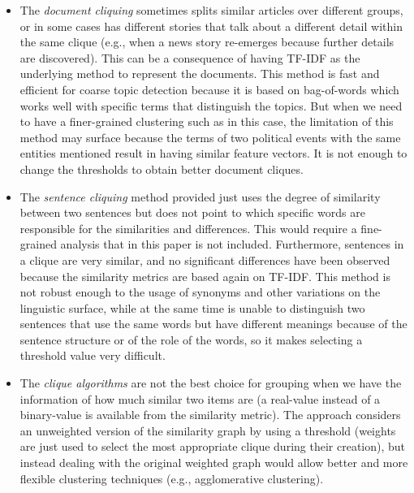 \begin{itemize}
    \item The \emph{document cliquing}
    sometimes splits similar articles over different groups, or in some cases has different stories that talk about a different detail within the same clique (e.g., when a news story re-emerges because further details are discovered).
    This can be a consequence of having TF-IDF as the underlying method to represent the documents.
    This method is fast and efficient for coarse topic detection because it is based on bag-of-words which works well with specific terms that distinguish the topics.
    But when we need to have a finer-grained clustering such as in this case, the limitation of this method may surface because the terms of two political events with the same entities mentioned result in having similar feature vectors.
    It is not enough to change the thresholds to obtain better document cliques.
    \item The \emph{sentence cliquing} method provided just uses the degree of similarity between two sentences but does not point to which specific words are responsible for the similarities and differences. This would require a fine-grained analysis that in this paper is not included. Furthermore, sentences in a clique are very similar, and no significant differences have been observed because the similarity metrics are based again on TF-IDF. This method is not robust enough to the usage of synonyms and other variations on the linguistic surface, while at the same time is unable to distinguish two sentences that use the same words but have different meanings because of the sentence structure or of the role of the words, so it makes selecting a threshold value very difficult.
    \item The \emph{clique algorithms} are not the best choice for grouping when we have the information of how much similar two items are (a real-value instead of a binary-value is available from the similarity metric). The approach considers an unweighted version of the similarity graph by using a threshold (weights are just used to select the most appropriate clique during their creation), but instead dealing with the original weighted graph would allow better and more flexible clustering techniques (e.g., agglomerative clustering). %
\end{itemize}





